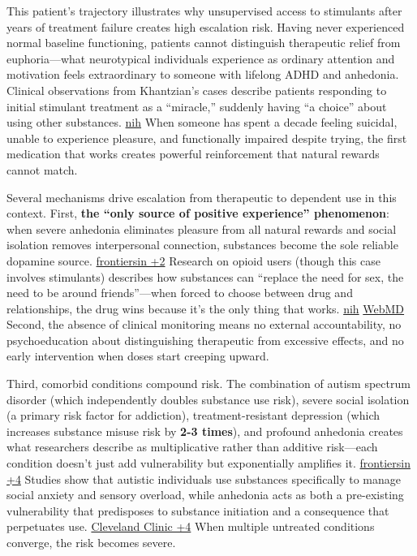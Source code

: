 This patient's trajectory illustrates why unsupervised access to stimulants after years of treatment failure creates high escalation risk. Having never experienced normal baseline functioning, patients cannot distinguish therapeutic relief from euphoria---what neurotypical individuals experience as ordinary attention and motivation feels extraordinary to someone with lifelong ADHD and anhedonia. Clinical observations from Khantzian's cases describe patients responding to initial stimulant treatment as a ``miracle,'' suddenly having ``a choice'' about using other substances. \href{https://pmc.ncbi.nlm.nih.gov/articles/PMC4227391/}{nih} When someone has spent a decade feeling suicidal, unable to experience pleasure, and functionally impaired despite trying, the first medication that works creates powerful reinforcement that natural rewards cannot match.

Several mechanisms drive escalation from therapeutic to dependent use in this context. First, \textbf{the ``only source of positive experience'' phenomenon}: when severe anhedonia eliminates pleasure from all natural rewards and social isolation removes interpersonal connection, substances become the sole reliable dopamine source. \href{https://www.frontiersin.org/journals/psychiatry/articles/10.3389/fpsyt.2019.00311/full}{frontiersin +2} Research on opioid users (though this case involves stimulants) describes how substances can ``replace the need for sex, the need to be around friends''---when forced to choose between drug and relationships, the drug wins because it's the only thing that works. \href{https://pmc.ncbi.nlm.nih.gov/articles/PMC8259283/}{nih} \href{https://www.webmd.com/add-adhd/adhd-and-substance-abuse-is-there-a-link}{WebMD} Second, the absence of clinical monitoring means no external accountability, no psychoeducation about distinguishing therapeutic from excessive effects, and no early intervention when doses start creeping upward.

Third, comorbid conditions compound risk. The combination of autism spectrum disorder (which independently doubles substance use risk), severe social isolation (a primary risk factor for addiction), treatment-resistant depression (which increases substance misuse risk by \textbf{2-3 times}), and profound anhedonia creates what researchers describe as multiplicative rather than additive risk---each condition doesn't just add vulnerability but exponentially amplifies it. \href{https://www.frontiersin.org/journals/psychiatry/articles/10.3389/fpsyt.2019.00311/full}{frontiersin +4} Studies show that autistic individuals use substances specifically to manage social anxiety and sensory overload, while anhedonia acts as both a pre-existing vulnerability that predisposes to substance initiation and a consequence that perpetuates use. \href{https://my.clevelandclinic.org/health/symptoms/23224-executive-dysfunction}{Cleveland Clinic +4} When multiple untreated conditions converge, the risk becomes severe.

